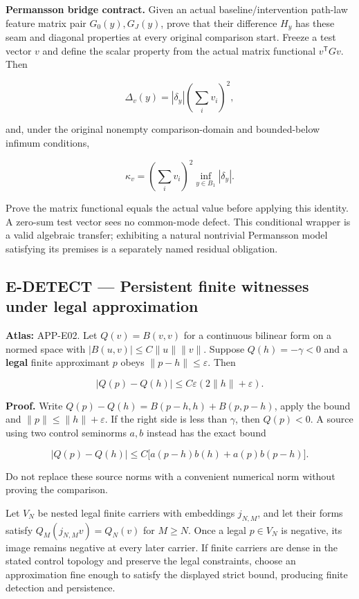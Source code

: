 \documentclass[
  11pt,
  a4paper,
]{article}
\newcommand{\codewrap}[1]{{\ttfamily\seqsplit{#1}}}
\begin{document}
\textbf{Permansson bridge contract.} Given an actual
baseline/intervention path-law feature matrix pair \(G_0(y),G_J(y)\),
prove that their difference \(H_y\) has these seam and diagonal
properties at every original comparison start. Freeze a test vector
\(v\) and define the scalar property from the actual matrix functional
\(v^{\mathsf T}Gv\). Then

\[\Delta_v(y)=|\delta_y|\left(\sum_i v_i\right)^2,\]

and, under the original nonempty comparison-domain and bounded-below
infimum conditions,

\[\kappa_v=\left(\sum_i v_i\right)^2\inf_{y\in B_1}|\delta_y|.\]

Prove the matrix functional equals the actual \codewrap{RegimePropertyMap}
value before applying this identity. A zero-sum test vector sees no
common-mode defect. This conditional wrapper is a valid algebraic
transfer; exhibiting a natural nontrivial Permansson model satisfying
its premises is a separately named residual obligation.

\subsection{E-DETECT --- Persistent finite witnesses under legal
approximation}\label{e-detect-persistent-finite-witnesses-under-legal-approximation}

\textbf{Atlas:} APP-E02. Let \(Q(v)=B(v,v)\) for a continuous bilinear
form on a normed space with \(|B(u,v)|\le C\|u\|\|v\|\). Suppose
\(Q(h)=-\gamma<0\) and a \textbf{legal} finite approximant \(p\) obeys
\(\|p-h\|\le\varepsilon\). Then

\[|Q(p)-Q(h)|\le C\varepsilon(2\|h\|+\varepsilon).\]

\textbf{Proof.} Write \(Q(p)-Q(h)=B(p-h,h)+B(p,p-h)\), apply the bound
and \(\|p\|\le\|h\|+\varepsilon\). If the right side is less than
\(\gamma\), then \(Q(p)<0\). A source using two control seminorms
\(a,b\) instead has the exact bound

\[|Q(p)-Q(h)|\le C\bigl[a(p-h)b(h)+a(p)b(p-h)\bigr].\]

Do not replace these source norms with a convenient numerical norm
without proving the comparison.

Let \(V_N\) be nested legal finite carriers with embeddings \(j_{N,M}\),
and let their forms satisfy \(Q_M(j_{N,M}v)=Q_N(v)\) for \(M\ge N\).
Once a legal \(p\in V_N\) is negative, its image remains negative at
every later carrier. If finite carriers are dense in the stated control
topology and preserve the legal constraints, choose an approximation
fine enough to satisfy the displayed strict bound, producing finite
detection and persistence.
\end{document}
